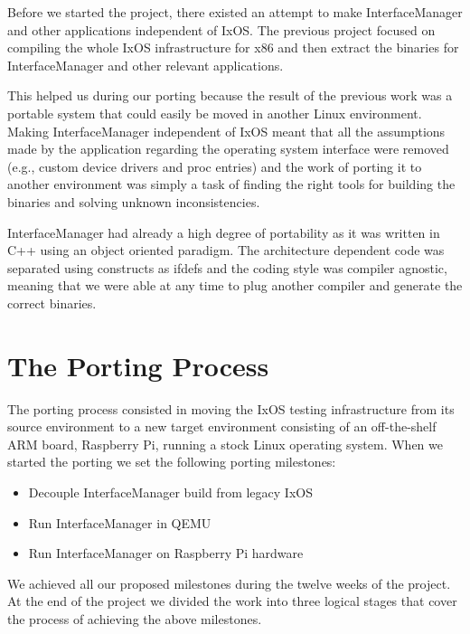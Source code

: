 Before we started the project, there existed an attempt to make InterfaceManager
and other applications independent of IxOS. The previous project focused on
compiling the whole IxOS infrastructure for x86 and then extract the binaries
for InterfaceManager and other relevant applications.

This helped us during our porting because the result of the previous work was a
portable system that could easily be moved in another Linux environment.
Making InterfaceManager independent of IxOS meant that all the assumptions made
by the application regarding the operating system interface were removed (e.g.,
custom device drivers and proc entries) and the work of porting it to another
environment was simply a task of finding the right tools for building the
binaries and solving unknown inconsistencies.

InterfaceManager had already a high degree of portability as it was written
in C++ using an object oriented paradigm. The architecture dependent code was
separated using constructs as ifdefs and the coding style was compiler agnostic,
meaning that we were able at any time to plug another compiler and generate the
correct binaries.

\section{The Porting Process}


The porting process consisted in moving the IxOS testing infrastructure from its
source environment to a new target environment consisting of an off-the-shelf
ARM board, Raspberry Pi, running a stock Linux operating system. When we started
the porting we set the following porting milestones:
\begin{itemize}
    \item Decouple InterfaceManager build from legacy IxOS
    \item Run InterfaceManager in QEMU
    \item Run InterfaceManager on Raspberry Pi hardware
\end{itemize}
We achieved all our proposed milestones during the twelve weeks of the project.
At the end of the project we divided the work into three logical stages
that cover the process of achieving the above milestones.


